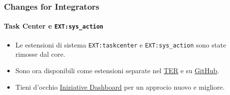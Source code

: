 
\begin{frame}[fragile]
	\frametitle{Changes for Integrators}
	\framesubtitle{Task Center e \texttt{EXT:sys\_action}}

	\begin{itemize}

		\item Le estensioni di sistema \texttt{EXT:taskcenter} e \texttt{EXT:sys\_action}
			sono state rimosse dal core.

		\item Sono ora disponibili come estensioni separate nel
			\href{https://extensions.typo3.org/}{TER}
			e su
			\href{https://github.com/FriendsOfTYPO3}{GitHub}.

		\item Tieni d'occhio
			\href{https://typo3.org/community/teams/typo3-development/initiatives/typo3-dashboard-initiative/}{Iniziative Dashboard}
			per un approcio nuovo e migliore.

	\end{itemize}

\end{frame}


